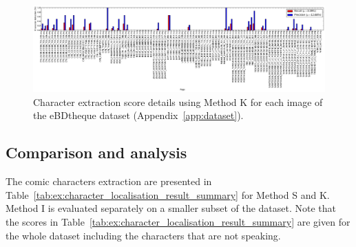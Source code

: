 \begin{figure}[h]
 \centering
  \label{fig:ex:character_method_C_auto_extraction_detail}
  \includegraphics[trim= 0mm 0mm 0mm 0mm, clip, width=\textwidth]{2014-09-04_cleaned_validated_from_method_B_for_panel_text_balloon_and_method_A_for_character_all_Character.pdf}
  
 \caption[Character extraction score details using Method K for each image of the eBDtheque dataset]{Character extraction score details using Method K for each image of the eBDtheque dataset (Appendix~\ref{app:dataset}).
 }
 \label{fig:ex:character_methodC_extraction_detail}
\end{figure}



\subsection{Comparison and analysis} %
\label{sub:result_analysis}


The comic characters extraction are presented in Table~\ref{tab:ex:character_localisation_result_summary} for Method S and K.
Method I is evaluated separately on a smaller subset of the dataset.
Note that the scores in Table~\ref{tab:ex:character_localisation_result_summary} are given for the whole dataset including the characters that are not speaking.


